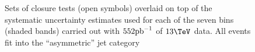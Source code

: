 \begin{figure}[h!]
  \begin{center}
     ~~
     \\
     ~~
     \\
    \caption{Sets of closure tests (open symbols) overlaid on top of
      the systematic uncertainty estimates used for each of the seven
      \scalht bins (shaded bands) carried out with $552\ipb$ of
      $13\tev$ data. All events fit into the ``asymmetric'' jet
      category}
    \label{fig:closureDataAsym}
  \end{center} 
\end{figure}


